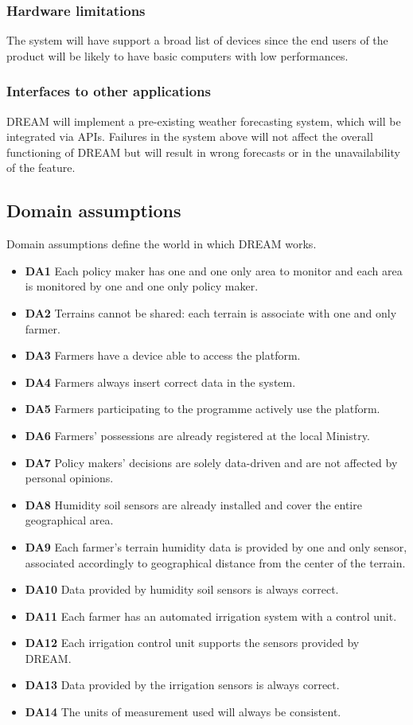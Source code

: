 \documentclass[10pt]{article}
\begin{document}
\subsubsection{Hardware limitations}
The system will have support a broad list of devices since the end users of the product will be likely
to have basic computers with low performances.
\subsubsection{Interfaces to other applications}
DREAM will implement a pre-existing weather forecasting system, which will be integrated via APIs. Failures in the 
system above will not affect the overall functioning of DREAM but will result in wrong forecasts or in the unavailability of the feature.
\subsection{Domain assumptions}
Domain assumptions define the world in which DREAM works. 
\begin{itemize}
    \item[] \textbf{DA1} Each policy maker has one and one only area to monitor and each area is monitored by one and one only policy maker.
    \item[] \textbf{DA2} Terrains cannot be shared: each terrain is associate with one and only farmer. 
    \item[] \textbf{DA3} Farmers have a device able to access the platform. 
    \item[] \textbf{DA4} Farmers always insert correct data in the system.
    \item[] \textbf{DA5} Farmers participating to the programme actively use the platform.
    \item[] \textbf{DA6} Farmers' possessions are already registered at the local Ministry.
    \item[] \textbf{DA7} Policy makers' decisions are solely data-driven and are not affected by personal opinions.
    \item[] \textbf{DA8} Humidity soil sensors are already installed and cover the entire geographical area.
    \item[] \textbf{DA9} Each farmer's terrain humidity data is provided by one and only sensor, associated accordingly to geographical distance from the center of the terrain.
    \item[] \textbf{DA10} Data provided by humidity soil sensors is always correct.
    \item[] \textbf{DA11} Each farmer has an automated irrigation system with a control unit.
    \item[] \textbf{DA12} Each irrigation control unit supports the sensors provided by DREAM.
    \item[] \textbf{DA13} Data provided by the irrigation sensors is always correct.
    \item[] \textbf{DA14} The units of measurement used will always be consistent. 
\end{itemize}
\newpage
\end{document}
